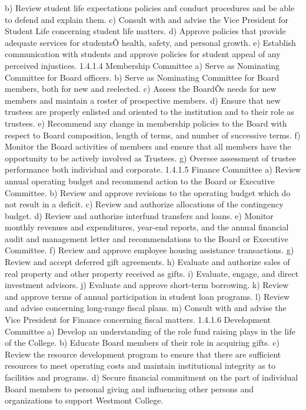 \documentclass[letterpaper, 11pt]{article}
\begin{document}
b) Review student life expectations policies and conduct procedures and be able to defend and explain them.
c) Consult with and advise the Vice President for Student Life concerning student life matters.
d) Approve policies that provide adequate services for studentsÕ health, safety, and personal growth.
e) Establish communication with students and approve policies for student appeal of any perceived injustices.
1.4.1.4 Membership Committee
a) Serve as Nominating Committee for Board officers.
b) Serve as Nominating Committee for Board members, both for new and reelected.
c) Assess the BoardÕs needs for new members and maintain a roster of prospective members.
d) Ensure that new trustees are properly enlisted and oriented to the institution and to their role as trustees.
e) Recommend any change in membership policies to the Board with respect to Board composition, length of terms, and number of successive terms.
f) Monitor the Board activities of members and ensure that all members have the opportunity to be actively involved as Trustees.
g) Oversee assessment of trustee performance both individual and corporate.
1.4.1.5 Finance Committee
a) Review annual operating budget and recommend action to the Board or Executive Committee.
b) Review and approve revisions to the operating budget which do not result in a deficit.
c) Review and authorize allocations of the contingency budget.
d) Review and authorize interfund transfers and loans.
e) Monitor monthly revenues and expenditures, year-end reports, and the annual financial audit and management letter and recommendations to the Board or Executive Committee.
f) Review and approve employee housing assistance transactions.
g) Review and accept deferred gift agreements.
h) Evaluate and authorize sales of real property and other property received as gifts.
i) Evaluate, engage, and direct investment advisors.
j) Evaluate and approve short-term borrowing.
k) Review and approve terms of annual participation in student loan programs.
l) Review and advise concerning long-range fiscal plans.
m) Consult with and advise the Vice President for Finance concerning fiscal matters.
1.4.1.6 Development Committee
a) Develop an understanding of the role fund raising plays in the life of the College.
b) Educate Board members of their role in acquiring gifts.
c) Review the resource development program to ensure that there are sufficient resources to meet operating costs and maintain institutional integrity as to facilities and programs.
d) Secure financial commitment on the part of individual Board members to personal giving and influencing other persons and organizations to support Westmont College.
\end{document}
